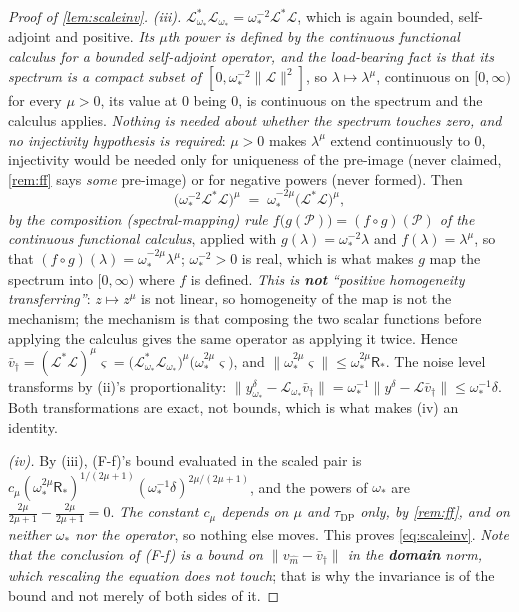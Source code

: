 \begin{proof}[Proof of \cref{lem:scaleinv}]
\emph{(iii).} $\mathcal L^{\ast}_{\omega_\ast}\mathcal L_{\omega_\ast}=\omega_\ast^{-2}\mathcal L^{\ast}\mathcal L$, which is
again bounded, self-adjoint and positive. \emph{Its $\mu$th power is defined by the continuous functional
calculus for a bounded self-adjoint operator, and the load-bearing fact is that its spectrum is a compact
subset of $[0,\omega_\ast^{-2}\|\mathcal L\|^{2}]$}, so $\lambda\mapsto\lambda^{\mu}$, continuous on
$[0,\infty)$ for every $\mu>0$, its value at $0$ being $0$, is continuous on the spectrum and the
calculus applies. \emph{Nothing is needed about whether the spectrum touches zero, and no injectivity
hypothesis is required}: $\mu>0$ makes $\lambda^{\mu}$ extend continuously to $0$, injectivity would be
needed only for uniqueness of the pre-image (never claimed, \cref{rem:ff} says \emph{some} pre-image)
or for negative powers (never formed). Then
\[
\big(\omega_\ast^{-2}\mathcal L^{\ast}\mathcal L\big)^{\mu}
\;=\;\omega_\ast^{-2\mu}\big(\mathcal L^{\ast}\mathcal L\big)^{\mu} ,
\]
\emph{by the composition (spectral-mapping) rule $f\big(g(\mathcal P)\big)=(f\circ g)(\mathcal P)$ of the
continuous functional calculus}, applied with $g(\lambda)=\omega_\ast^{-2}\lambda$ and
$f(\lambda)=\lambda^{\mu}$, so that $(f\circ g)(\lambda)=\omega_\ast^{-2\mu}\lambda^{\mu}$;
$\omega_\ast^{-2}>0$ is real, which is what makes
$g$ map the spectrum into $[0,\infty)$ where $f$ is defined. \emph{This is \textbf{not} ``positive
homogeneity transferring''}: $z\mapsto z^{\mu}$ is not linear, so homogeneity of the
map is not the mechanism; the mechanism is that composing the two scalar functions before applying the
calculus gives the same operator as applying it twice. Hence
$\bar v_\dagger=(\mathcal L^{\ast}\mathcal L)^{\mu}\varsigma
=\big(\mathcal L^{\ast}_{\omega_\ast}\mathcal L_{\omega_\ast}\big)^{\mu}\big(\omega_\ast^{2\mu}\varsigma\big)$,
and $\|\omega_\ast^{2\mu}\varsigma\|\le\omega_\ast^{2\mu}\mathsf R_\ast$. The noise level transforms by
(ii)'s proportionality:
$\|y^\delta_{\omega_\ast}-\mathcal L_{\omega_\ast}\bar v_\dagger\|=\omega_\ast^{-1}\|y^\delta-\mathcal L\bar v_\dagger\|\le\omega_\ast^{-1}\delta$.
Both transformations are exact, not bounds, which is what makes (iv) an identity.

\emph{(iv).} By (iii), (F-f)'s bound evaluated in the scaled pair is
$c_\mu(\omega_\ast^{2\mu}\mathsf R_\ast)^{1/(2\mu+1)}(\omega_\ast^{-1}\delta)^{2\mu/(2\mu+1)}$, and the
powers of $\omega_\ast$ are $\tfrac{2\mu}{2\mu+1}-\tfrac{2\mu}{2\mu+1}=0$. \emph{The constant $c_\mu$
depends on $\mu$ and $\tau_{\mathrm{DP}}$ only, by \cref{rem:ff}, and on neither $\omega_\ast$ nor the
operator}, so nothing else moves. This proves \eqref{eq:scaleinv}. \emph{Note that the conclusion of
(F-f) is a bound on $\|v_{\hat m}-\bar v_\dagger\|$ in the \textbf{domain} norm, which rescaling the
equation does not touch}; that is why the invariance is of the bound and not merely of both sides of it.


\end{proof}
